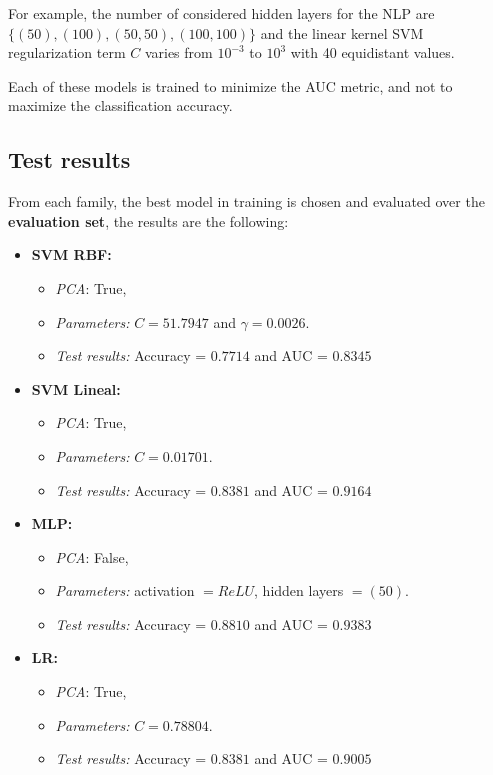 \documentclass[11pt]{article}
\begin{document}
For example, the number of considered hidden layers for the NLP are \( \{(50), (100), (50, 50), (100, 100)\} \) and the linear kernel SVM regularization term \( C \) varies from \( 10^{-3} \) to \( 10^{3} \) with 40 equidistant values.

Each of these models is trained to minimize the AUC metric, and not to maximize the classification accuracy.

\subsection*{Test results}

From each family, the best model in training is chosen and evaluated over the \textbf{evaluation set}, the results are the following:
\begin{itemize}
  \item \textbf{SVM RBF: } 
    \begin{itemize}
      \item \emph{PCA}: True,
      \item \emph{Parameters: } \( C =  51.7947\) and \( \gamma = 0.0026\).
      \item \emph{Test results: } Accuracy = \( 0.7714 \) and AUC = \( 0.8345 \) 
    \end{itemize}
  \item \textbf{SVM Lineal: }
    \begin{itemize}
      \item \emph{PCA}: True,
      \item \emph{Parameters: } \( C =  0.01701\).
      \item \emph{Test results: } Accuracy = \( 0.8381 \) and AUC = \( 0.9164 \) 
    \end{itemize}
  \item \textbf{MLP: }
    \begin{itemize}
      \item \emph{PCA}: False,
      \item \emph{Parameters: } activation \( = ReLU \), hidden layers \( = (50) \).
      \item \emph{Test results: } Accuracy = \( 0.8810 \) and AUC = \( 0.9383 \) 
    \end{itemize}
  \item \textbf{LR: }
    \begin{itemize}
      \item \emph{PCA}: True,
      \item \emph{Parameters: } \( C =  0.78804\).
      \item \emph{Test results: } Accuracy = \( 0.8381 \) and AUC = \( 0.9005 \) 
    \end{itemize}
\end{itemize}
\end{document}
